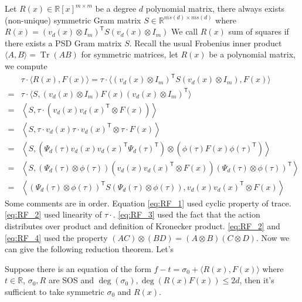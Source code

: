 \documentclass[smallextended]{svjour3}
\newcommand{\R}{\mathbb{R}}
\DeclareMathOperator{\Tr}{Tr}
\begin{document}
Let $R(x)\in\R[x]^{m\times m}$ be a degree $d$ polynomial matrix, there always exists (non-unique) symmetric Gram matrix $S\in \R^{ms(d)\times ms(d)}$ where $R(x) = (v_d(x)\otimes I_m)^{\mathsf{T}} S (v_d(x)\otimes I_m)$ We call $R(x)$ sum of squares if there exists a PSD Gram matrix $S$. Recall the usual Frobenius inner product $\langle A,B\rangle=\Tr(AB)$ for symmetric matrices, let $R(x)$ be a polynomial matrix, we compute \begin{align}
    &\tau\cdot\langle R(x),F(x)\rangle=\tau\cdot\langle (v_d(x)\otimes I_m)^{\mathsf{T}} S (v_d(x)\otimes I_m),F(x)\rangle\\
    =&\tau\cdot\langle S, (v_d(x)\otimes I_m)F(x)(v_d(x)\otimes I_m)^{\mathsf{T}}\rangle\label{eq:RF_1}\\
    =&\left\langle S, \tau\cdot\left(v_d(x)v_d(x)^{\mathsf{T}} \otimes F(x) \right) \right\rangle\label{eq:RF_2} \\
    =& \left\langle S, \tau \cdot v_d(x)\tau \cdot v_d(x)^{\mathsf{T}} \otimes \tau \cdot F(x) \right\rangle\label{eq:RF_3}\\
    =&\left\langle S, \left(\Psi_d(\tau) v_d(x)v_d(x)^{\mathsf{T}}\Psi_d(\tau)^{\mathsf{T}}\right) \otimes \left(\phi(\tau)F(x)\phi(\tau)^{\mathsf{T}}\right) \right\rangle \\
    =& \left\langle S, \left(\Psi_d(\tau)\otimes \phi(\tau)\right)(v_d(x)v_d(x)^{\mathsf{T}} \otimes F(x))(\Psi_d(\tau)\otimes \phi(\tau))^{\mathsf{T}} \right\rangle \label{eq:RF_4}\\
    =& \left\langle\left(\Psi_d(\tau)\otimes \phi(\tau)\right)^{\mathsf{T}} S \left(\Psi_d(\tau)\otimes \phi(\tau)\right), v_d(x)v_d(x)^{\mathsf{T}} \otimes F(x) \right\rangle
\end{align}
Some comments are in order. Equation \eqref{eq:RF_1} used cyclic property of trace. \eqref{eq:RF_2} used linearity of $\tau\cdot$. \eqref{eq:RF_3} used the fact that the action distributes over product and definition of Kronecker product. \eqref{eq:RF_2} and \eqref{eq:RF_4} used the property $(AC)\otimes (BD)=(A\otimes B)(C\otimes D)$. Now we can give the following reduction theorem. Let's \begin{theorem}
  Suppose there is an equation of the form $f-t = \sigma_{0}+\langle R(x),F(x)\rangle$ where $t\in\R$, $\sigma_0,R$ are SOS and $\deg(\sigma_0),\deg(R(x)F(x))\leq 2d$, then it's sufficient to take symmetric $\sigma_0$ and $R(x)$.
\end{theorem}
\end{document}
